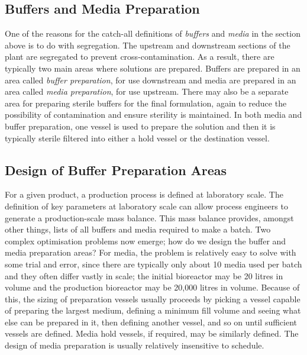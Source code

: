 \subsection{Buffers and Media Preparation}\label{SS.buffmedprep}

One of the reasons for the catch-all definitions of \emph{buffers} and
\emph{media} in the section above is to do with segregation.
The upstream and downstream sections of the plant are segregated to prevent
cross-contamination.
As a result, there are typically two main areas where solutions are prepared.
Buffers are prepared in an area called \emph{buffer preparation}, for use
downstream and media are prepared in an area called \emph{media preparation},
for use upstream.
There may also be a separate area for preparing sterile buffers for the final
formulation, again to reduce the possibility of contamination and ensure
sterility is maintained.
In both media and buffer preparation, one vessel is used to prepare the solution
and then it is typically sterile filtered into either a hold vessel or the
destination vessel.

\subsection{Design of Buffer Preparation Areas}\label{SS.buffprepdes}

For a given product, a production process is defined at laboratory scale.  The
definition of key parameters at laboratory scale can allow process engineers to
generate a production-scale mass balance.  This mass balance provides, amongst
other things, lists of all buffers and media required to make a batch.  Two
complex optimisation problems now emerge; how do we design the buffer and media
preparation areas?  For media, the problem is relatively easy to solve with some
trial and error, since there are typically only about 10 media used per batch
and they often differ vastly in scale; the initial bioreactor may be 20 litres
in volume and the production bioreactor may be 20,000 litres in volume.  Because
of this, the sizing of preparation vessels usually proceeds by picking a vessel
capable of preparing the largest medium, defining a minimum fill volume and
seeing what else can be prepared in it, then defining another vessel, and so on
until sufficient vessels are defined.  Media hold vessels, if required, may be 
similarly defined.  The design of media preparation is usually relatively
insensitive to schedule.

